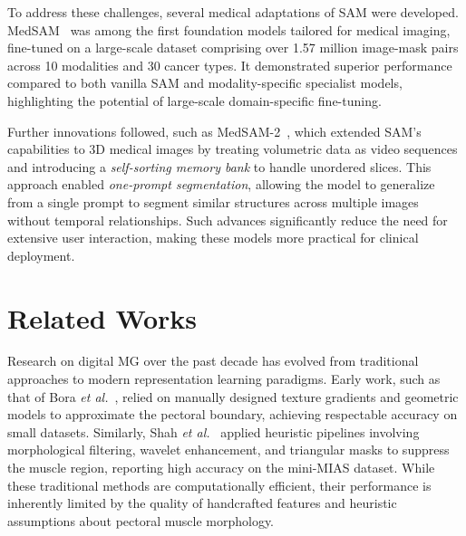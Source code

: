 \documentclass[runningheads]{llncs}
\begin{document}
To address these challenges, several medical adaptations of \ac{SAM} were
developed. \ac{MedSAM}~\cite{Ma2024} was among the first foundation models
tailored for medical imaging, fine-tuned on a large-scale dataset
comprising over 1.57 million image-mask pairs across 10 modalities and
30 cancer types. It demonstrated superior performance compared to both
vanilla SAM and modality-specific specialist models, highlighting the
potential of large-scale domain-specific fine-tuning.

Further innovations followed, such as MedSAM-2~\cite{Zhu2024}, which
extended SAM’s capabilities to 3D medical images by treating
volumetric data as video sequences and introducing a
\emph{self-sorting memory bank} to handle unordered slices. This
approach enabled \emph{one-prompt segmentation}, allowing the model to
generalize from a single prompt to segment similar structures across
multiple images without temporal relationships. Such advances
significantly reduce the need for extensive user interaction, making
these models more practical for clinical deployment.


\section{Related Works}\label{sec:RelatedWorks}

Research on digital \ac{MG} over the past decade has evolved from
traditional approaches to modern representation learning
paradigms. Early work, such as that of Bora \emph{et
  al.}~\cite{Bora2016}, relied on manually designed texture gradients
and geometric models to approximate the pectoral boundary, achieving
respectable accuracy on small datasets. Similarly, Shah \emph{et
  al.}~\cite{Shah2015} applied heuristic pipelines involving
morphological filtering, wavelet enhancement, and triangular masks to
suppress the muscle region, reporting high accuracy on the mini-\ac{MIAS}
dataset. While these traditional methods are computationally
efficient, their performance is inherently limited by the quality of
handcrafted features and heuristic assumptions about pectoral muscle
morphology.
\end{document}
